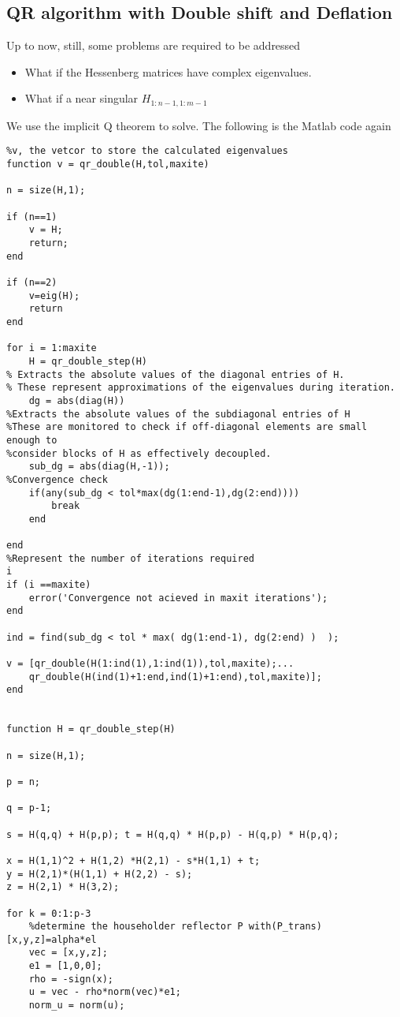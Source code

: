 \subsection{QR algorithm with Double shift and Deflation}
Up to now, still, some problems are required to be addressed
\begin{itemize}
    \item What if the Hessenberg matrices have complex eigenvalues.
    \item What if a near singular $H_{1:n-1,1:m-1}$
\end{itemize}
We use the implicit Q theorem to solve. The following is the Matlab code again
\begin{verbatim}
%v, the vetcor to store the calculated eigenvalues
function v = qr_double(H,tol,maxite)

n = size(H,1);

if (n==1)
    v = H;
    return;
end

if (n==2)
    v=eig(H);
    return
end

for i = 1:maxite
    H = qr_double_step(H)
% Extracts the absolute values of the diagonal entries of H.
% These represent approximations of the eigenvalues during iteration.
    dg = abs(diag(H))
%Extracts the absolute values of the subdiagonal entries of H 
%These are monitored to check if off-diagonal elements are small enough to 
%consider blocks of H as effectively decoupled.
    sub_dg = abs(diag(H,-1));
%Convergence check
    if(any(sub_dg < tol*max(dg(1:end-1),dg(2:end))))
        break
    end

end
%Represent the number of iterations required
i
if (i ==maxite)
    error('Convergence not acieved in maxit iterations');
end

ind = find(sub_dg < tol * max( dg(1:end-1), dg(2:end) )  );

v = [qr_double(H(1:ind(1),1:ind(1)),tol,maxite);...
    qr_double(H(ind(1)+1:end,ind(1)+1:end),tol,maxite)];
end


function H = qr_double_step(H)

n = size(H,1);

p = n;

q = p-1;

s = H(q,q) + H(p,p); t = H(q,q) * H(p,p) - H(q,p) * H(p,q);

x = H(1,1)^2 + H(1,2) *H(2,1) - s*H(1,1) + t;
y = H(2,1)*(H(1,1) + H(2,2) - s);
z = H(2,1) * H(3,2);

for k = 0:1:p-3
    %determine the householder reflector P with(P_trans)[x,y,z]=alpha*el
    vec = [x,y,z];
    e1 = [1,0,0];
    rho = -sign(x);
    u = vec - rho*norm(vec)*e1;
    norm_u = norm(u);


\end{verbatim}
